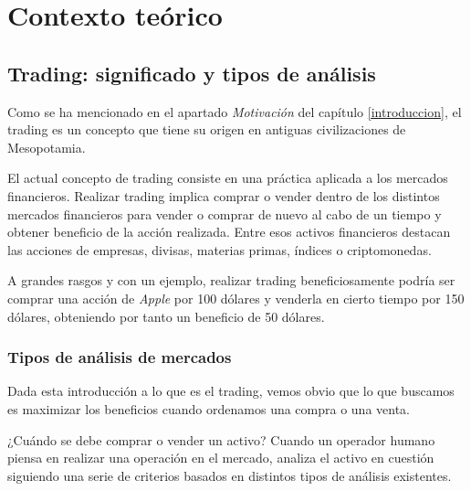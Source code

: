 
\chapter{Contexto teórico}

\section{Trading: significado y tipos de análisis}

Como se ha mencionado en el apartado \textit{Motivación} del capítulo \ref{introduccion}, el trading es un concepto que tiene su origen en antiguas civilizaciones de Mesopotamia. \newline


El actual concepto de trading consiste en una práctica aplicada a los mercados financieros. Realizar trading implica comprar o vender dentro de los distintos mercados financieros para vender o comprar de nuevo al cabo de un tiempo y obtener beneficio de la acción realizada. Entre esos activos financieros destacan las acciones de empresas, divisas, materias primas, índices o criptomonedas. \newline

A grandes rasgos y con un ejemplo, realizar trading beneficiosamente podría ser comprar una acción de \textit{Apple} por 100 dólares y venderla en cierto tiempo por 150 dólares, obteniendo por tanto un beneficio de 50 dólares. \newline

\subsection{Tipos de análisis de mercados}

Dada esta introducción a lo que es el trading, vemos obvio que lo que buscamos es maximizar los beneficios cuando ordenamos una compra o una venta. \newline

¿Cuándo se debe comprar o vender un activo? Cuando un operador humano piensa en realizar una operación en el mercado, analiza el activo en cuestión siguiendo una serie de criterios basados en distintos tipos de análisis existentes. \newline

